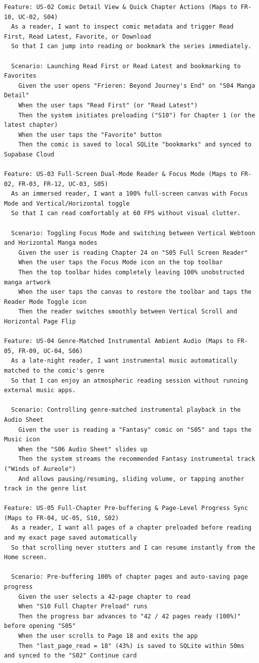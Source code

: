 \begin{lstlisting}[language=gherkin,caption={US-02, US-03, US-04 \& US-05: Detail View, Full-Screen Reader, Ambient Audio, and Preload.}]
Feature: US-02 Comic Detail View & Quick Chapter Actions (Maps to FR-10, UC-02, S04)
  As a reader, I want to inspect comic metadata and trigger Read First, Read Latest, Favorite, or Download
  So that I can jump into reading or bookmark the series immediately.

  Scenario: Launching Read First or Read Latest and bookmarking to Favorites
    Given the user opens "Frieren: Beyond Journey's End" on "S04 Manga Detail"
    When the user taps "Read First" (or "Read Latest")
    Then the system initiates preloading ("S10") for Chapter 1 (or the latest chapter)
    When the user taps the "Favorite" button
    Then the comic is saved to local SQLite "bookmarks" and synced to Supabase Cloud

Feature: US-03 Full-Screen Dual-Mode Reader & Focus Mode (Maps to FR-02, FR-03, FR-12, UC-03, S05)
  As an immersed reader, I want a 100% full-screen canvas with Focus Mode and Vertical/Horizontal toggle
  So that I can read comfortably at 60 FPS without visual clutter.

  Scenario: Toggling Focus Mode and switching between Vertical Webtoon and Horizontal Manga modes
    Given the user is reading Chapter 24 on "S05 Full Screen Reader"
    When the user taps the Focus Mode icon on the top toolbar
    Then the top toolbar hides completely leaving 100% unobstructed manga artwork
    When the user taps the canvas to restore the toolbar and taps the Reader Mode Toggle icon
    Then the reader switches smoothly between Vertical Scroll and Horizontal Page Flip

Feature: US-04 Genre-Matched Instrumental Ambient Audio (Maps to FR-05, FR-09, UC-04, S06)
  As a late-night reader, I want instrumental music automatically matched to the comic's genre
  So that I can enjoy an atmospheric reading session without running external music apps.

  Scenario: Controlling genre-matched instrumental playback in the Audio Sheet
    Given the user is reading a "Fantasy" comic on "S05" and taps the Music icon
    When the "S06 Audio Sheet" slides up
    Then the system streams the recommended Fantasy instrumental track ("Winds of Aureole")
    And allows pausing/resuming, sliding volume, or tapping another track in the genre list

Feature: US-05 Full-Chapter Pre-buffering & Page-Level Progress Sync (Maps to FR-04, UC-05, S10, S02)
  As a reader, I want all pages of a chapter preloaded before reading and my exact page saved automatically
  So that scrolling never stutters and I can resume instantly from the Home screen.

  Scenario: Pre-buffering 100% of chapter pages and auto-saving page progress
    Given the user selects a 42-page chapter to read
    When "S10 Full Chapter Preload" runs
    Then the progress bar advances to "42 / 42 pages ready (100%)" before opening "S05"
    When the user scrolls to Page 18 and exits the app
    Then "last_page_read = 18" (43%) is saved to SQLite within 50ms and synced to the "S02" Continue card
\end{lstlisting}

